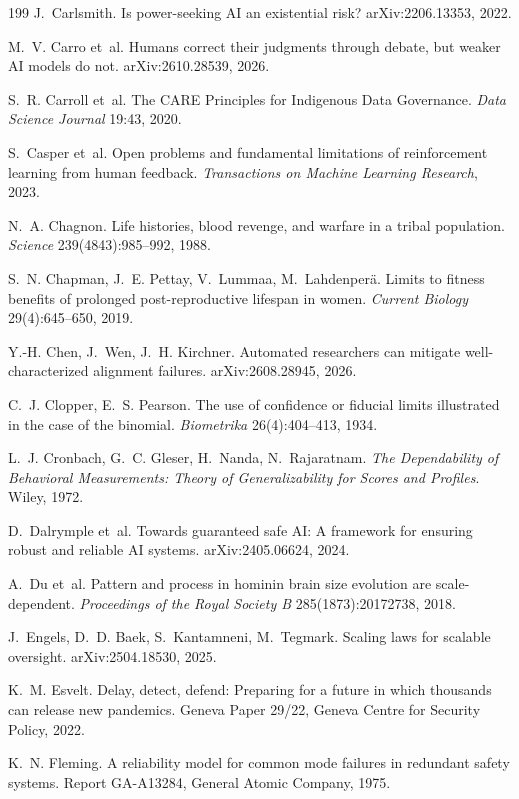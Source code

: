 \documentclass[10pt,twocolumn,letterpaper]{article}
\theoremstyle{definition}
\begin{document}
\begin{thebibliography}{199}
 J.~Carlsmith. Is power-seeking AI an existential risk? arXiv:2206.13353, 2022.

 M.~V. Carro et~al. Humans correct their judgments through debate, but weaker AI models do not. arXiv:2610.28539, 2026.

 S.~R. Carroll et~al. The CARE Principles for Indigenous Data Governance. \emph{Data Science Journal} 19:43, 2020.

 S.~Casper et~al. Open problems and fundamental limitations of reinforcement learning from human feedback. \emph{Transactions on Machine Learning Research}, 2023.

 N.~A. Chagnon. Life histories, blood revenge, and warfare in a tribal population. \emph{Science} 239(4843):985--992, 1988.

 S.~N. Chapman, J.~E. Pettay, V.~Lummaa, M.~Lahdenper\"a. Limits to fitness benefits of prolonged post-reproductive lifespan in women. \emph{Current Biology} 29(4):645--650, 2019.

 Y.-H. Chen, J.~Wen, J.~H. Kirchner. Automated researchers can mitigate well-characterized alignment failures. arXiv:2608.28945, 2026.

 C.~J. Clopper, E.~S. Pearson. The use of confidence or fiducial limits illustrated in the case of the binomial. \emph{Biometrika} 26(4):404--413, 1934.

 L.~J. Cronbach, G.~C. Gleser, H.~Nanda, N.~Rajaratnam. \emph{The Dependability of Behavioral Measurements: Theory of Generalizability for Scores and Profiles}. Wiley, 1972.

 D.~Dalrymple et~al. Towards guaranteed safe AI: A framework for ensuring robust and reliable AI systems. arXiv:2405.06624, 2024.

 A.~Du et~al. Pattern and process in hominin brain size evolution are scale-dependent. \emph{Proceedings of the Royal Society B} 285(1873):20172738, 2018.

 J.~Engels, D.~D. Baek, S.~Kantamneni, M.~Tegmark. Scaling laws for scalable oversight. arXiv:2504.18530, 2025.

 K.~M. Esvelt. Delay, detect, defend: Preparing for a future in which thousands can release new pandemics. Geneva Paper 29/22, Geneva Centre for Security Policy, 2022.

 K.~N. Fleming. A reliability model for common mode failures in redundant safety systems. Report GA-A13284, General Atomic Company, 1975.


\end{thebibliography}
\end{document}
